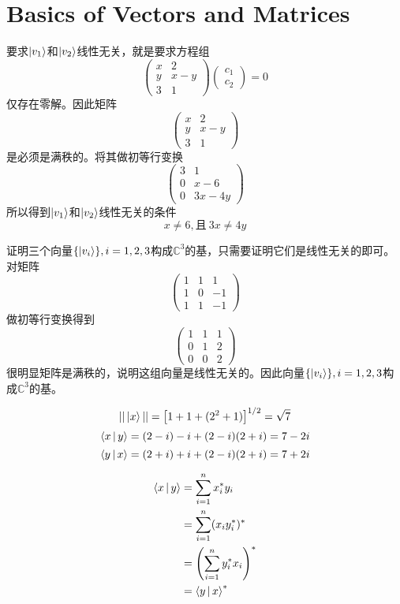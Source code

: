 \section{Basics of Vectors and Matrices}
\exercise

要求$\ket{v_1}$和$\ket{v_2}$线性无关，就是要求方程组
\[
\begin{pmatrix}
x & 2 \\
y & x - y \\
3 & 1
\end{pmatrix}
\begin{pmatrix}
c_1 \\ c_2
\end{pmatrix}
= 0
\]
仅存在零解。因此矩阵
\[
\begin{pmatrix}
x & 2 \\
y & x - y \\
3 & 1
\end{pmatrix}
\]
是必须是满秩的。将其做初等行变换
\[
\begin{pmatrix}
3 & 1 \\
0 & x - 6 \\
0 & 3x - 4y
\end{pmatrix}
\]
所以得到$\ket{v_1}$和$\ket{v_2}$线性无关的条件
\[
x \neq 6, \text{且}\ 3x \neq 4y
\]

\exercise

证明三个向量$\{\ket{v_i}\}, i = 1, 2, 3$构成$\mathbb{C}^3$的基，只需要证明它们是线性无关的即可。对矩阵
\[
\begin{pmatrix}
1 & 1 & 1 \\
1 & 0 & -1 \\
1 & 1 & -1
\end{pmatrix}
\]
做初等行变换得到
\[
\begin{pmatrix}
1 & 1 & 1 \\
0 & 1 & 2 \\
0 & 0 & 2
\end{pmatrix}
\]
很明显矩阵是满秩的，说明这组向量是线性无关的。因此向量$\{\ket{v_i}\}, i = 1, 2, 3$构成$\mathbb{C}^3$的基。

\exercise
\[
||\ket{x}|| = \left[1 + 1 + (2^2 + 1)\right]^{1/2} = \sqrt{7}
\]
\[
\Braket{x|y} = (2 - i) -i + (2 - i)(2 + i) = 7 - 2i
\]
\[
\Braket{y|x} = (2 + i) + i + (2 - i)(2 + i) = 7 + 2i
\]

\exercise
\[
\begin{split}
\Braket{x|y} &= \sum\limits_{i=1}^n x_i^* y_i \\
&= \sum\limits_{i=1}^n (x_i y_i^*)^* \\
&= \left(\sum\limits_{i=1}^n y_i^* x_i \right)^* \\
&= \Braket{y|x}^*
\end{split}
\]

